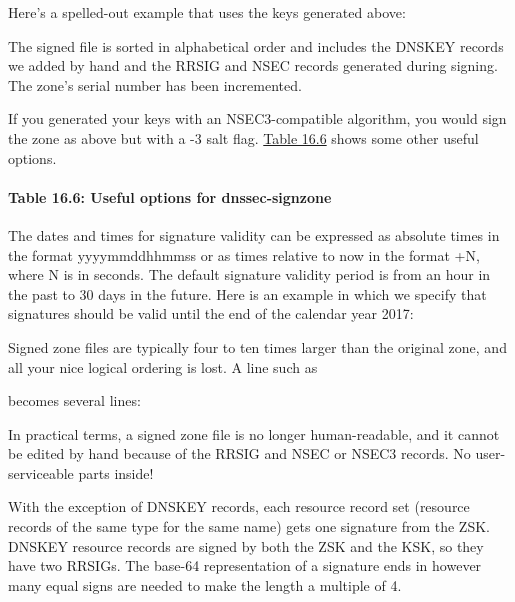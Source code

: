 Here's a spelled-out example that uses the keys generated above:


The signed file is sorted in alphabetical order and includes the DNSKEY
records we added by hand and the RRSIG and NSEC records generated during
signing. The zone's serial number has been incremented.

If you generated your keys with an NSEC3-compatible algorithm, you would
sign the zone as above but with a {-3} {salt} flag.
\protect\hyperlink{part0024_split_064.htmlux5cux23_idTextAnchor944}{Table
16.6} shows some other useful options.

\paragraph[{Table 16.6: }Useful options for
{dnssec-signzone}]{\texorpdfstring{{Table 16.6:
}\protect\hypertarget{part0024_split_064.htmlux5cux23_idTextAnchor944}{}{}Useful
options for
{dnssec-signzone}}{Table 16.6: Useful options for dnssec-signzone}}


The dates and times for signature validity can be expressed as absolute
times in the format {yyyymmddhhmmss} or as times relative to now in the
format {+}{N}, where {N} is in seconds. The default signature validity
period is from an hour in the past to 30 days in the future. Here is an
example in which we specify that signatures should be valid until the
end of the calendar year 2017:


Signed zone files are typically four to ten times larger than the
original zone, and all your nice logical ordering is lost. A line such
as


becomes several lines:


In practical terms, a signed zone file is no longer human-readable, and
it cannot be edited by hand because of the RRSIG and NSEC or NSEC3
records. No user-serviceable parts inside!

With the exception of DNSKEY records, each resource record set (resource
records of the same type for the same name) gets one signature from the
ZSK. DNSKEY resource records are signed by both the ZSK and the KSK, so
they have two RRSIGs. The base-64 representation of a signature ends in
however many equal signs are needed to make the length a multiple of 4.

